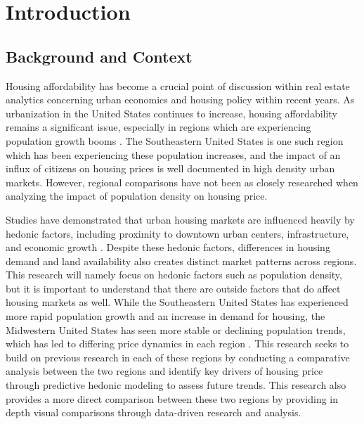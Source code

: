 \documentclass[journal,article,submit,pdftex,moreauthors]{Definitions/mdpi}
\begin{document}
\pagestyle{fancy}
\thispagestyle{empty} %
\flushbottom
\raggedbottom



\section{Introduction}

\subsection{Background and Context}

Housing affordability has become a crucial point of discussion within real estate analytics concerning urban economics and housing policy within recent years. As urbanization in the United States continues to increase, housing affordability remains a significant issue, especially in regions which are experiencing population growth booms \citep{desilver2024}. The Southeastern United States is one such region which has been experiencing these population increases, and the impact of an influx of citizens on housing prices is well documented in high density urban markets. However, regional comparisons have not been as closely researched when analyzing the impact of population density on housing price.

Studies have demonstrated that urban housing markets are influenced heavily by hedonic factors, including proximity to downtown urban centers, infrastructure, and economic growth \citep{sirmans_2005_the}. Despite these hedonic factors, differences in housing demand and land availability also creates distinct market patterns across regions. This research will namely focus on hedonic factors such as population density, but it is important to understand that there are outside factors that do affect housing markets as well. While the Southeastern United States has experienced more rapid population growth and an increase in demand for housing, the Midwestern United States has seen more stable or declining population trends, which has led to differing price dynamics in each region \citep{souders_2016_the}. This research seeks to build on previous research in each of these regions by conducting a comparative analysis between the two regions and identify key drivers of housing price through predictive hedonic modeling to assess future trends. This research also provides a more direct comparison between these two regions by providing in depth visual comparisons through data-driven research and analysis.
\end{document}
